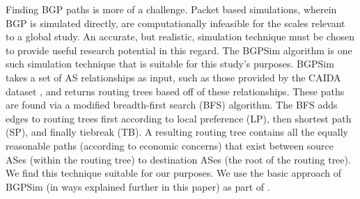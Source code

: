 \par Finding BGP paths is more of
a challenge.
Packet based simulations, wherein BGP is simulated
directly, are computationally infeasible for the scales relevant to a
global study. An accurate, but realistic, simulation technique must be
chosen to provide useful research potential in this regard.  The
BGPSim algorithm \cite{quicksand} is one such simulation technique
that is suitable for this study's purposes. BGPSim takes a set of AS
relationships as input, such as those provided by the CAIDA dataset
\cite{CAIDA}, and returns routing trees based off of these
relationships. These paths are found via a modified breadth-first
search (BFS) algorithm. The BFS adds edges to routing trees first
according to local preference (LP), then shortest path (SP), and
finally tiebreak (TB).  A resulting routing tree contains all the
equally reasonable paths (according to economic concerns) that exist
between source ASes (within the routing tree) to destination ASes (the
root of the routing tree). We find this technique suitable  for our
purposes. We use the basic approach of BGPSim (in ways explained further in this
paper) as part of \toolname{}.
